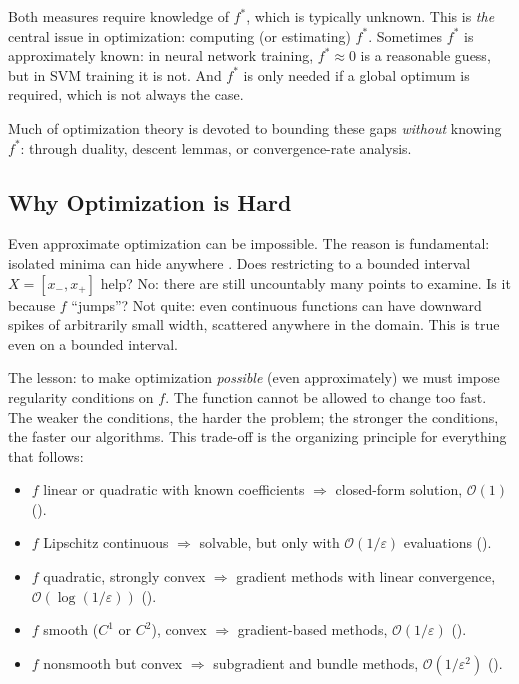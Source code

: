 Both measures require knowledge of $f^*$, which is typically unknown. This is \emph{the} central issue in optimization: computing (or estimating) $f^*$. Sometimes $f^*$ is approximately known: in neural network training, $f^* \approx 0$ is a reasonable guess, but in SVM training it is not. And $f^*$ is only needed if a global optimum is required, which is not always the case.

Much of optimization theory is devoted to bounding these gaps \emph{without} knowing $f^*$: through duality, descent lemmas, or convergence-rate analysis.


\subsection{Why Optimization is Hard}\label{sec:why-hard}

Even approximate optimization can be impossible.
The reason is fundamental: isolated minima can hide anywhere \cite{hansen1995}.
Does restricting to a bounded interval $X = [x_-, x_+]$ help?
No: there are still uncountably many points to examine.
Is it because $f$ ``jumps''?
Not quite: even continuous functions can have downward spikes of arbitrarily small width, scattered anywhere in the domain.
This is true even on a bounded interval.

The lesson: to make optimization \emph{possible} (even approximately) we must impose regularity conditions on $f$.
The function cannot be allowed to change too fast.
The weaker the conditions, the harder the problem; the stronger the conditions, the faster our algorithms.
This trade-off is the organizing principle for everything that follows:
\begin{itemize}
	\item $f$ linear or quadratic with known coefficients $\Longrightarrow$ closed-form solution, $\mathcal{O}(1)$ ().
	\item $f$ Lipschitz continuous $\Longrightarrow$ solvable, but only with $\mathcal{O}(1/\varepsilon)$ evaluations ().
	\item $f$ quadratic, strongly convex $\Longrightarrow$ gradient methods with linear convergence, $\mathcal{O}(\log(1/\varepsilon))$ ().
	\item $f$ smooth ($C^1$ or $C^2$), convex $\Longrightarrow$ gradient-based methods, $\mathcal{O}(1/\varepsilon)$ ().
	\item $f$ nonsmooth but convex $\Longrightarrow$ subgradient and bundle methods, $\mathcal{O}(1/\varepsilon^2)$ ().
\end{itemize}

